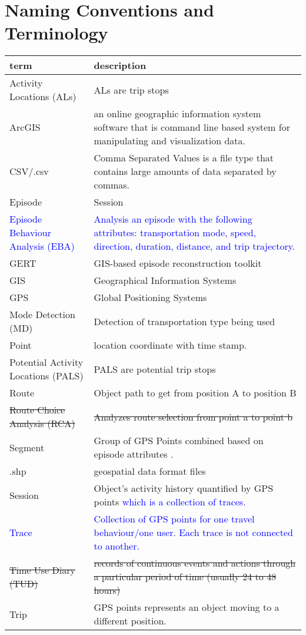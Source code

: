 \documentclass[12pt, titlepage]{article}
\begin{document}
\section{Naming Conventions and Terminology}
\begin{tabular}{l p{6cm}} 
  \toprule		
  \textbf{term} & \textbf{description}\\
  \midrule 
  Activity Locations (ALs) & ALs are trip stops \\
  ArcGIS & an online geographic information system software that is command line based system for manipulating and visualization data.\\
  CSV/.csv & Comma Separated Values is a file type that contains large amounts of data separated by commas. \\
  Episode & Session\\
  \textcolor{blue}{Episode Behaviour Analysis (EBA)} & \textcolor{blue}{Analysis an episode with the following attributes: transportation mode, speed, direction, duration, distance, and trip trajectory.} \\
  GERT & GIS-based episode reconstruction toolkit \\
  GIS & Geographical Information Systems\\
  GPS & Global Positioning Systems\\
  Mode Detection (MD) & Detection of transportation type being used \\
  Point & location coordinate with time stamp.\\
  Potential Activity Locations (PALS) & PALS are potential trip stops \\
  Route & Object path to get from position A to position B\\
  \sout{Route Choice Analysis (RCA)} & \sout{Analyzes route selection from point a to point b}\\
  Segment & Group of GPS Points combined based on episode attributes .\\
  .shp & geospatial data format files\\
  Session & Object's activity history quantified by GPS points \textcolor{blue}{which is a collection of traces.} \\
  \textcolor{blue}{Trace} & \textcolor{blue}{Collection of GPS points for one travel behaviour/one user. Each trace is not connected to another.}\\
  \sout{Time Use Diary (TUD)} & \sout{records of continuous events and actions through a particular period of time (usually 24 to 48 hours)}\\
  Trip & GPS points represents an object moving to a different position.\\
  
  \bottomrule
\end{tabular}\\
\end{document}
